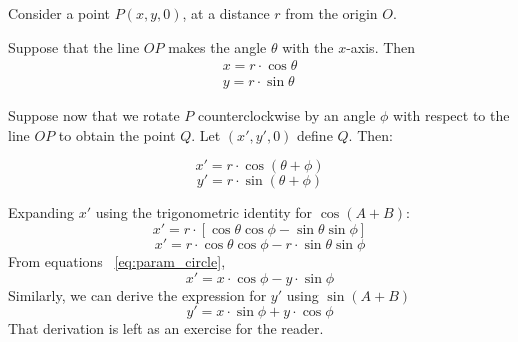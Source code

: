 Consider a point \(P(x, y, 0)\), at a distance \(r\) from the origin \(O\).

Suppose that the line \(OP\) makes the angle \(\theta\) with the \(x\)-axis. 
Then 
\begin{equation}
\begin{aligned}
x = r \cdot \cos \theta \\
y =  r \cdot \sin \theta
\end{aligned}    
\label{eq:param_circle}
\end{equation}

\begin{minipage}[t]{0.7\textwidth}
Suppose now that we rotate \(P\) counterclockwise by an angle \(\phi\) with respect to the line \(OP\) to obtain the point \(Q\). Let \((x', y', 0)\) define \(Q\). Then:

\[
x' = r \cdot \cos (\theta + \phi)
\]
\[
y' = r \cdot \sin (\theta + \phi)
\]
\end{minipage}%
\hfill
\begin{minipage}[t]{0.28\textwidth}



\end{minipage}


Expanding \(x'\) using the trigonometric identity for \(\cos(A+B)\):
\[
x' = r \cdot [\cos \theta \cos \phi - \sin \theta \sin \phi]
\]
\[
x' = r \cdot \cos \theta \cos \phi - r \cdot \sin \theta \sin \phi
\]
From equations ~\eqref{eq:param_circle},
\begin{equation}
    x' = x \cdot \cos \phi - y \cdot \sin \phi
\end{equation}
Similarly, we can derive the expression for \(y'\) using \(\sin(A+B)\) 
\begin{equation}
y' = x \cdot \sin \phi + y \cdot \cos \phi
\end{equation}
That derivation is left as an exercise for the reader.


